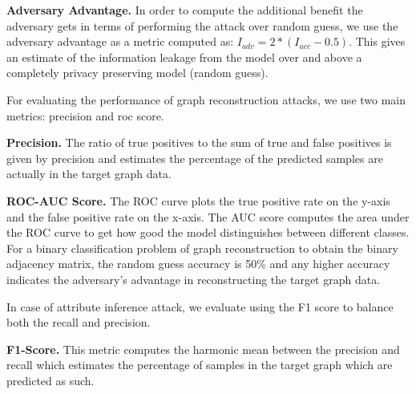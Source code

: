 \noindent\textbf{Adversary Advantage.} In order to compute the additional benefit the adversary gets in terms of performing the attack over random guess, we use the adversary advantage as a metric computed as: $I_{adv} = 2*(I_{acc}-0.5)$.
This gives an estimate of the information leakage from the model over and above a completely privacy preserving model (random guess).

For evaluating the performance of graph reconstruction attacks, we use two main metrics: precision and roc score.

\noindent\textbf{Precision.} The ratio of true positives to the sum of true and false positives is given by precision and estimates the percentage of the predicted samples are actually in the target graph data.

\noindent\textbf{ROC-AUC Score.} The ROC curve plots the true positive rate on the y-axis and the false positive rate on the x-axis. The AUC score computes the area under the ROC curve to get how good the model distinguishes between different classes.
For a binary classification problem of graph reconstruction to obtain the binary adjacency matrix, the random guess accuracy is 50\% and any higher accuracy indicates the adversary's advantage in reconstructing the target graph data.

In case of attribute inference attack, we evaluate using the F1 score to balance both the recall and precision.

\noindent\textbf{F1-Score.} This metric computes the harmonic mean between the precision and recall which estimates the percentage of samples in the target graph which are predicted as such.
